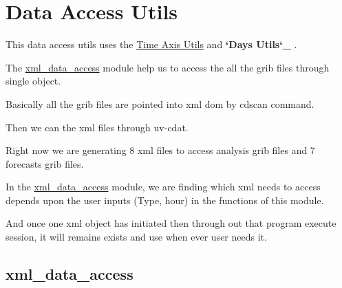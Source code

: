 \documentclass[letterpaper,10pt,english]{sphinxmanual}
\begin{document}
\section{Data Access Utils}
\label{diagnosisutils:data-access-utils}
This data access utils uses the {\hyperref[diagnosisutils:time-axis-utils]{Time Axis Utils}} and {\color{red}\bfseries{}{}`Days Utils{}`\_} .

The {\hyperref[diagnosisutils:xml-data-access]{xml\_data\_access}} module help us to access the all the grib files through single object.

Basically all the grib files are pointed into xml dom by cdscan command.

Then we can the xml files through uv-cdat.

Right now we are generating 8 xml files to access analysis grib files and 7 forecasts grib files.

In the {\hyperref[diagnosisutils:xml-data-access]{xml\_data\_access}} module, we are finding which xml needs to access depends upon the user inputs (Type, hour) in the functions of this module.

And once one xml object has initiated then through out that program execute session, it will remains exists and use when ever user needs it.


\subsection{xml\_data\_access}
\label{diagnosisutils:xml-data-access}\label{diagnosisutils:id1}\label{diagnosisutils:module-xml_data_access}\label{diagnosisutils:module-xml_data_access}
\end{document}
